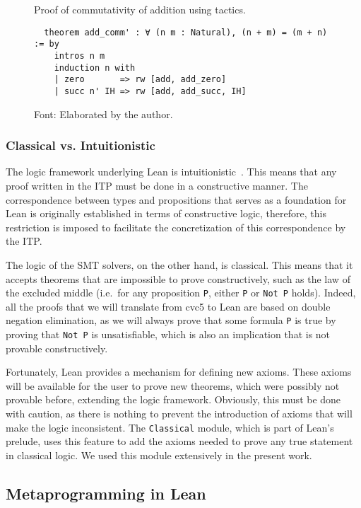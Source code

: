 \begin{figure}[t]
 \caption{Proof of commutativity of addition using tactics.}\label{addComm2}
\begin{verbatim}
  theorem add_comm' : ∀ (n m : Natural), (n + m) = (m + n) := by
    intros n m
    induction n with
    | zero       => rw [add, add_zero]
    | succ n' IH => rw [add, add_succ, IH]
\end{verbatim}
\caption*{Font: Elaborated by the author.}
\end{figure}


\subsubsection{Classical vs. Intuitionistic}

The logic framework underlying Lean is intuitionistic~\cite{intuitionistic}. This means that any proof written in the ITP
must be done in a constructive manner. The correspondence between types and propositions that serves as a foundation for Lean
is originally established in terms of constructive logic, therefore, this restriction is imposed to facilitate the concretization
of this correspondence by the ITP.\

The logic of the SMT solvers, on the other hand, is classical. This means that it accepts theorems that are impossible to prove
constructively, such as the law of the excluded middle (i.e.\ for any proposition \texttt{P}, either \texttt{P} or \texttt{Not P}
holds). Indeed, all the proofs that we will translate from cvc5 to Lean are based on double negation elimination, as we will
always prove that some formula \texttt{P} is true by proving that \texttt{Not P} is unsatisfiable, which is also an implication
that is not provable constructively.

Fortunately, Lean provides a mechanism for defining new axioms.
%
These axioms will be available for the user to prove new theorems, which
were possibly not provable before, extending the logic framework.
%
Obviously, this must be done with caution, as there is nothing to
prevent the introduction of axioms that will make the logic inconsistent.
%
The \texttt{Classical} module, which is part of Lean's prelude, uses
this feature to add the axioms needed to prove any true statement in classical logic.
%
We used this module extensively in the present work.

\subsection{Metaprogramming in Lean}\label{sec:metaLean}

